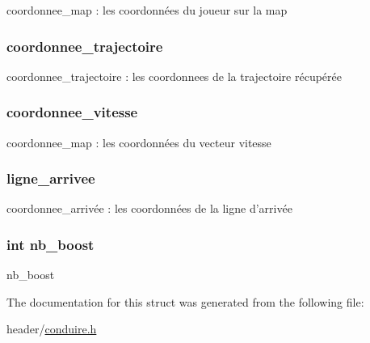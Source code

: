 coordonnee\-\_\-map \-: les coordonnées du joueur sur la map 

\hypertarget{struct_pilote_a86f53b7691951b4acc0c82a6a35f1d6b}{
\subsubsection[{coordonnee\-\_\-trajectoire}]{ coordonnee\-\_\-trajectoire}}\label{struct_pilote_a86f53b7691951b4acc0c82a6a35f1d6b}


coordonnee\-\_\-trajectoire \-: les coordonnees de la trajectoire récupérée 

\hypertarget{struct_pilote_a7b1edc3a7ac0ac9b74224d7c2fbb2bac}{
\subsubsection[{coordonnee\-\_\-vitesse}]{ coordonnee\-\_\-vitesse}}\label{struct_pilote_a7b1edc3a7ac0ac9b74224d7c2fbb2bac}


coordonnee\-\_\-map \-: les coordonnées du vecteur vitesse 

\hypertarget{struct_pilote_a1ae9305296c689ff4b27a5fcc132a7cd}{
\subsubsection[{ligne\-\_\-arrivee}]{ ligne\-\_\-arrivee}}\label{struct_pilote_a1ae9305296c689ff4b27a5fcc132a7cd}


coordonnee\-\_\-arrivée \-: les coordonnées de la ligne d'arrivée 

\hypertarget{struct_pilote_ad077cd6faff912e4515c4edc8a3c9581}{
\subsubsection[{nb\-\_\-boost}]{\setlength{\rightskip}{0pt plus 5cm}int nb\-\_\-boost}}\label{struct_pilote_ad077cd6faff912e4515c4edc8a3c9581}


nb\-\_\-boost 



The documentation for this struct was generated from the following file\-:\begin{DoxyCompactItemize}
\item 
header/\hyperlink{conduire_8h}{conduire.\-h}\end{DoxyCompactItemize}
